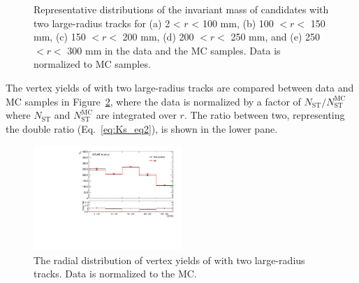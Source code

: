 \begin{figure}[!htb]
    \caption{Representative distributions of the invariant mass of \Ks candidates with two large-radius tracks for (a) 2 < $r$ < 100 mm, (b) 100 $<r<$ 150 mm, (c) 150 $<r<$ 200 mm, (d) 200 $<r<$ 250 mm, and (e) 250 $<r<$ 300 mm in the data and the MC samples. Data is normalized to MC samples.}
    \label{fig:Ks_mass}
\end{figure}

The vertex yields of \Ks with two large-radius tracks are compared between data and MC samples in Figure~\ref{fig:Ks_double_ratio}, where the data is normalized by a factor of $N_{\mathrm{ST}} / N_{\mathrm{ST}}^{\mathrm{MC}}$ where $N_{\mathrm{ST}}$ and $N_{\mathrm{ST}}^{\mathrm{MC}}$ are integrated over $r$. The ratio between two, representing the double ratio (Eq.~\ref{eq:Ks_eq2}), is shown in the lower pane.

\begin{figure}[!htb]
	\includegraphics[width=0.50\textwidth]{figures/m_syst_Ks_ratio_R.pdf}
	\centering
	\caption{The radial distribution of vertex yields of \Ks with two large-radius tracks. Data is normalized to the MC.} %
	\label{fig:Ks_double_ratio}
\end{figure}


